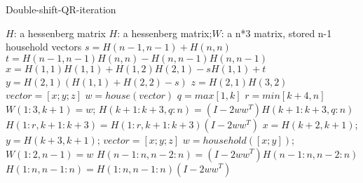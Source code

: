 \renewcommand{\algorithmicrequire}{\textbf{Input:}}
\renewcommand{\algorithmicensure}{\textbf{Output:}}
\begin{breakablealgorithm}
  \caption{Double-shift-QR-iteration}
  \label{alg::Double-shift-QR-iteration}
  \begin{algorithmic}[1]
    \Require $H$: a hessenberg matrix
    \Ensure $H$: a hessenberg matrix;$W$: a n*3 matrix, stored n-1 household vectors
    \State\(s=H(n-1,n-1)+H(n,n)\)
    \State\(t=H(n-1,n-1)H(n,n)-H(n,n-1)H(n,n-1)\)
    \State\(x=H(1,1)H(1,1)+H(1,2)H(2,1)-sH(1,1)+t\)
    \State\(y=H(2,1)(H(1,1)+H(2,2)-s)\)
    \State\(z=H(2,1)H(3,2)\)
    \State\(vector=[x;y;z]\)
      \State\(w=house(vector)\)
      \State\(q=max[1,k]\)
      \State\(r=min[k+4,n]\)
      \State\(W(1:3,k+1)=w\);   
      \State\(H(k+1:k+3,q:n)=(I-2w{w^T})H(k+1:k+3,q:n)\)
      \State\(H(1:r,k+1:k+3)=H(1:r,k+1:k+3)(I-2w{w^T})\)
      \State\(x=H(k+2,k+1)\);
      \State\(y=H(k+3,k+1)\);
      \State \(vector=[x;y;z]\)
      \EndIf
    \EndFor
      \State\(w=household([x;y])\);
      \State\(W(1:2,n-1)=w\)
      \State\(H(n-1:n,n-2:n)=(I-2w{w^T})H(n-1:n,n-2:n)\)
      \State\(H(1:n,n-1:n)=H(1:n,n-1:n)(I-2w{w^T})\)
  \end{algorithmic}
\end{breakablealgorithm}
